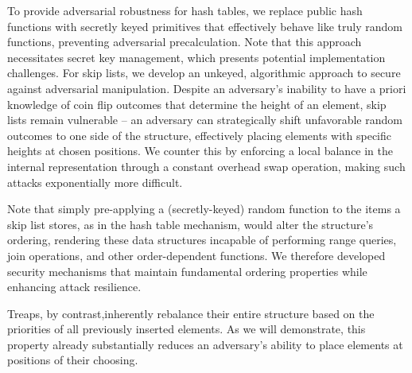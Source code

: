 To provide adversarial robustness for hash tables, we replace public hash functions with secretly keyed primitives that effectively behave like truly random functions, preventing adversarial precalculation. Note that this approach necessitates secret key management, which presents potential implementation challenges. For skip lists, we develop an unkeyed, algorithmic approach to secure against adversarial manipulation. Despite an adversary's inability to have a priori knowledge of coin flip outcomes that determine the height of an element, skip lists remain vulnerable -- an adversary can strategically shift unfavorable random outcomes to one side of the structure, effectively placing elements with specific heights at chosen positions. We counter this by enforcing a local balance in the internal representation through a constant overhead swap operation, making such attacks exponentially more difficult.

Note that simply pre-applying a (secretly-keyed) random function to the items a skip list stores, as in the hash table mechanism, would alter the structure's ordering, rendering these data structures incapable of performing range queries, join operations, and other order-dependent functions. We therefore developed security mechanisms that maintain fundamental ordering properties while enhancing attack resilience.

Treaps, by contrast,inherently rebalance their entire structure based on the priorities of all previously inserted elements. As we will demonstrate, this property already substantially reduces an adversary's ability to place elements at positions of their choosing.